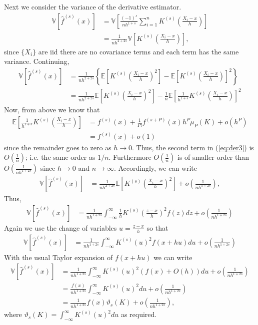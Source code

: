 \documentclass[12pt]{article}
\newcommand{\E}{\mathbb{E}}
\newcommand{\V}{\mathbb{V}}
\begin{document}
Next we consider the variance of the derivative estimator.
\begin{align*}
\V[\hat f^{(s)}(x)] &= \V\left[\frac{(-1)^s}{nh^{1+s}}\sum_{i=1}^n K^{(s)}\left(\frac{X_i - x}{h}\right)\right]\\
&=\frac{1}{nh^{2+2s}}\V\left[K^{(s)}\left(\frac{X_i - x}{h}\right)\right],
\end{align*}
since $\{X_i\}$ are iid there are no covariance terms and each term has the same variance. Continuing,
\begin{align}
\V[\hat f^{(s)}(x)] &=\frac{1}{nh^{2+2s}} \left\{\E\left[K^{(s)}\left(\frac{X_i - x}{h}\right)^2\right] - \E\left[K^{(s)}\left(\frac{X_i - x}{h}\right)\right]^2 \right\} \nonumber \\
&=\frac{1}{nh^{2+2s}} \E\left[K^{(s)}\left(\frac{X_i - x}{h}\right)^2\right] - \frac{1}{n} \E\left[\frac{1}{h^{1+s}}K^{(s)}\left(\frac{X_i - x}{h}\right)\right]^2 \label{eq:der3}
\end{align}
Now, from above we know that
\begin{align*}
\E\left[\frac{1}{h^{1+s}}K^{(s)}\left(\frac{X_i - x}{h}\right)\right] & =  f^{(s)}(x) + \frac{1}{P!} f^{(s+P)}(x)h^P\mu_P(K) + o(h^P)\\
&= f^{(s)}(x) + o(1)
\end{align*}
since the remainder goes to zero as $h\to0$. Thus, the second term in (\ref{eq:der3}) is $O(\frac{1}{n})$; i.e. the same order as $1/n$. Furthermore $O(\frac{1}{n})$ is of smaller order than $O(\frac{1}{nh^{1+2s}})$ since $h \to 0$ and $n\to \infty$. Accordingly, we can write
\begin{align*}
\V[\hat f^{(s)}(x)] &=\frac{1}{nh^{2+2s}} \E\left[K^{(s)}\left(\frac{X_i - x}{h}\right)^2\right] + o\left(\frac{1}{nh^{1+2s}}\right),
\end{align*}
Thus,
\begin{align*}
\V[\hat f^{(s)}(x)] &=\frac{1}{nh^{1+2s}} \int_{-\infty}^{\infty}\frac{1}{h}K^{(s)}\left(\frac{z- x}{h}\right)^2 f(z) dz + o\left(\frac{1}{nh^{1+2s}}\right)
\end{align*}
Again we use the change of variables $u = \frac{z - x}{h}$ so that
\begin{align*}
\V[\hat f^{(s)}(x)] &=\frac{1}{nh^{1+2s}} \int_{-\infty}^{\infty}K^{(s)}(u)^2 f(x+hu) du + o\left(\frac{1}{nh^{1+2s}}\right)
\end{align*}
With the usual Taylor expansion of $f(x+hu)$ we can write
\begin{align*}
\V[\hat f^{(s)}(x)] &=\frac{1}{nh^{1+2s}} \int_{-\infty}^{\infty}K^{(s)}(u)^2 (f(x) + O(h)) du + o\left(\frac{1}{nh^{1+2s}}\right)\\
&=\frac{f(x)}{nh^{1+2s}} \int_{-\infty}^{\infty}K^{(s)}(u)^2 du + o\left(\frac{1}{nh^{1+2s}}\right)\\
&=\frac{1}{nh^{1+2s}}f(x)\vartheta_{s}(K) + o\left(\frac{1}{nh^{1+2s}}\right),
\end{align*}
where $\vartheta_{s}(K) =  \int_{-\infty}^{\infty}K^{(s)}(u)^2 du$ as required.
\end{document}
